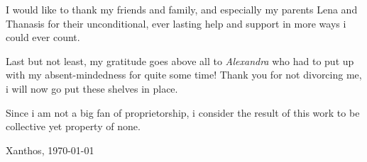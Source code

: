 I would like to thank my friends and family, and especially my parents
Lena and Thanasis for their unconditional, ever lasting help and support in more
ways i could ever count.

Last but not least, my gratitude goes above all to \emph{Alexandra}
who had to put up with my absent-mindedness for quite some time! Thank you for not 
divorcing me, i will now go put these shelves in place.

Since i am not a big fan of proprietorship, i consider the result of this work to 
be collective yet property of none.
\par
\begin{flushright}
  Xanthos, \today\par
\end{flushright}
\vfill
